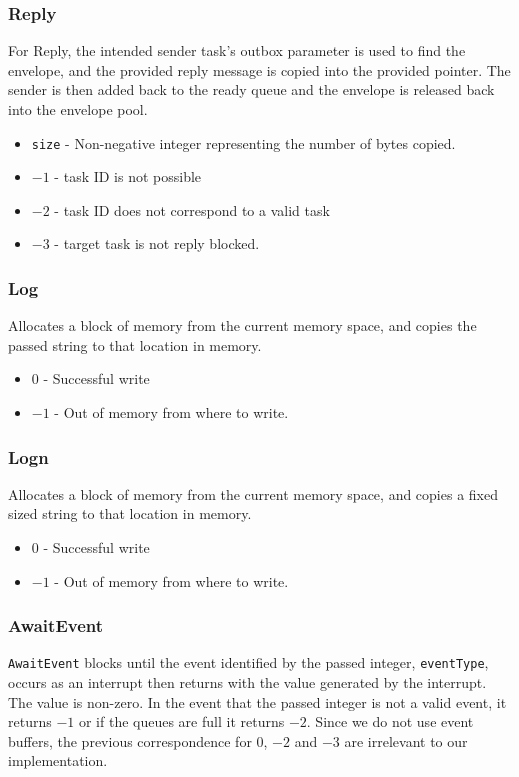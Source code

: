 \documentclass[12pt]{article}
\begin{document}
\subsubsection{Reply}
For Reply, the intended sender task's outbox parameter is used to find the envelope, and the provided reply message is copied into the provided pointer. The sender is then added back to the ready queue and the envelope is released back into the envelope pool.
\begin{itemize}
  \item \texttt{size} - Non-negative integer representing the number of bytes copied.
  \item $-1$ - task ID is not possible
  \item $-2$ - task ID does not correspond to a valid task
  \item $-3$ - target task is not reply blocked.
    \\
\end{itemize}
\subsubsection{Log}
Allocates a block of memory from the current memory space, and copies the passed string to that location in memory.
\begin{itemize}
  \item $0$ - Successful write
  \item $-1$ - Out of memory from where to write.
    \\
\end{itemize}
\subsubsection{Logn}
Allocates a block of memory from the current memory space, and copies a fixed sized string to that location in memory.
\begin{itemize}
  \item $0$ - Successful write
  \item $-1$ - Out of memory from where to write.
    \\
\end{itemize}
\subsubsection{AwaitEvent}
\texttt{AwaitEvent} blocks until the event identified by the passed integer, \texttt{eventType}, occurs as an interrupt then returns with the value generated by the interrupt.  The value is non-zero.  In the event that the passed integer is not a valid event, it returns $-1$ or if the queues are full it returns $-2$.  Since we do not use event buffers, the previous correspondence for $0$, $-2$ and $-3$ are irrelevant to our implementation.
\\
\end{document}
